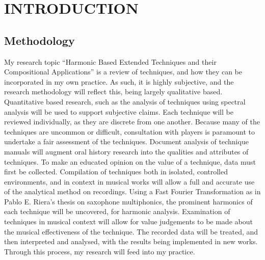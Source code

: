 

\chapter[INTRODUCTION]{INTRODUCTION}

\section{Methodology}
My research topic “Harmonic Based Extended Techniques and their Compositional Applications” is a review of techniques, and how they can be incorporated in my own practice. As such, it is highly subjective, and the research methodology will reflect this, being largely qualitative based. Quantitative based research, such as the analysis of techniques using spectral analysis will be used to support subjective claims. Each technique will be reviewed individually, as they are discrete from one another. Because many of the techniques are uncommon or difficult, consultation with players is paramount to undertake a fair assessment of the techniques. Document analysis of technique manuals will augment oral history research into the qualities and attributes of techniques. 
To make an educated opinion on the value of a technique, data must first be collected. Compilation of techniques both in isolated, controlled environments, and in context in musical works will allow a full and accurate use of the analytical method on recordings. Using a Fast Fourier Transformation as in Pablo E. Riera’s thesis on saxophone multiphonics, the prominent harmonics of each technique will be uncovered, for harmonic analysis.\cite{rieraComparativeStudySaxophone2014} Examination of techniques in musical context will allow for value judgements to be made about the musical effectiveness of the technique. The recorded data will be treated, and then interpreted and analysed, with the results being implemented in new works.\cite{torresMultiphonicsCompositionalElement2012} Through this process, my research will feed into my practice.
